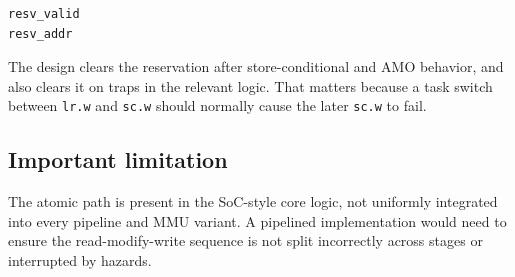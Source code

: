 \begin{lstlisting}[language={}]
resv_valid
resv_addr
\end{lstlisting}

The design clears the reservation after store-conditional and AMO behavior, and also clears it on traps in the relevant logic. That matters because a task switch between \texttt{lr.w} and \texttt{sc.w} should normally cause the later \texttt{sc.w} to fail.

\subsection{Important limitation}

The atomic path is present in the SoC-style core logic, not uniformly integrated into every pipeline and MMU variant. A pipelined implementation would need to ensure the read-modify-write sequence is not split incorrectly across stages or interrupted by hazards.

\bigskip

